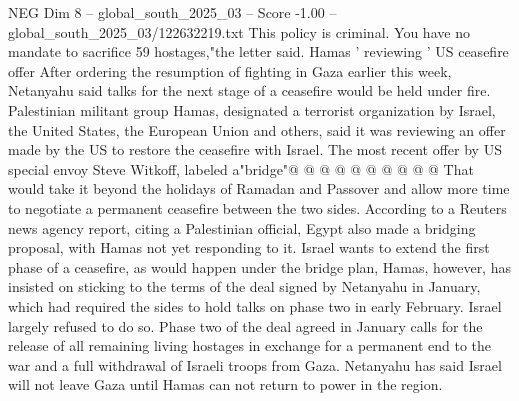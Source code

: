 \begin{textsample}{NEG Dim 8 – global\_south\_2025\_03 – Score -1.00 – global\_south\_2025\_03/122632219.txt}
This policy is criminal.
You have no mandate to sacrifice 59 hostages,"the letter said.
Hamas ' reviewing ' US ceasefire offer After ordering the resumption of fighting in Gaza earlier this week, Netanyahu said talks for the next stage of a ceasefire would be held under fire.
Palestinian militant group Hamas, designated a terrorist organization by Israel, the United States, the European Union and others, said it was reviewing an offer made by the US to restore the ceasefire with Israel.
The most recent offer by US special envoy Steve Witkoff, labeled a"bridge"@ @ @ @ @ @ @ @ @ @ That would take it beyond the holidays of Ramadan and Passover and allow more time to negotiate a permanent ceasefire between the two sides.
According to a Reuters news agency report, citing a Palestinian official, Egypt also made a bridging proposal, with Hamas not yet responding to it.
Israel wants to extend the first phase of a ceasefire, as would happen under the bridge plan, Hamas, however, has insisted on sticking to the terms of the deal signed by Netanyahu in January, which had required the sides to hold talks on phase two in early February.
Israel largely refused to do so.
Phase two of the deal agreed in January calls for the release of all remaining living hostages in exchange for a permanent end to the war and a full withdrawal of Israeli troops from Gaza.
Netanyahu has said Israel will not leave Gaza until Hamas can not return to power in the region.

\end{textsample}
